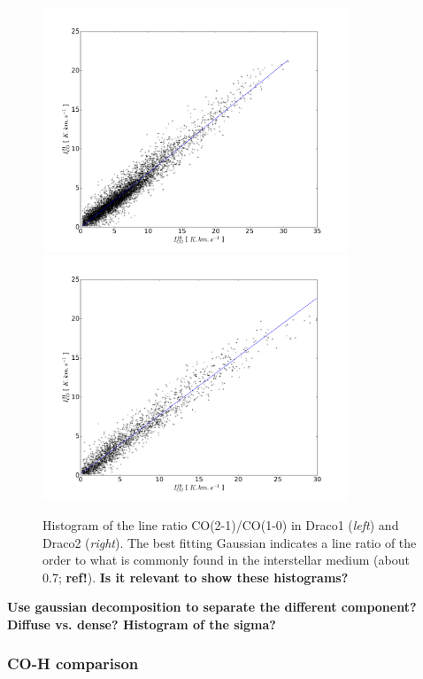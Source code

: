 \documentclass[traditabstract]{aa}
\begin{document}
\begin{figure}[h!]
  \centering
  \includegraphics[page=2,height=7.3cm,trim=60 30 90 75,clip=true]{Figures/Draco1_CO21-CO10.pdf}
  \hspace{3mm}
  \includegraphics[page=2,height=7.3cm,trim=70 30 90 75,clip=true]{Figures/Draco2_CO21-CO10.pdf}
  \caption{\label{ratio} Histogram of the line ratio CO(2-1)/CO(1-0) in Draco1 (\emph{left}) and Draco2 (\emph{right}). The best fitting Gaussian indicates a line ratio of the order to what is commonly found in the interstellar medium (about 0.7; \textbf{ref!}). \textbf{Is it relevant to show these histograms?}}
\end{figure}

\textbf{Use gaussian decomposition to separate the different component? Diffuse vs. dense? Histogram of the sigma?}
\subsubsection{CO-H comparison}
\end{document}

